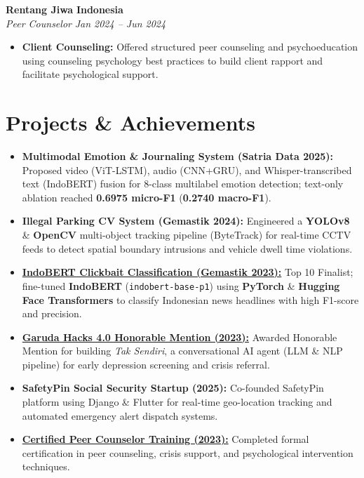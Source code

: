 \documentclass[letterpaper,10pt]{article}
\begin{document}
\noindent \textbf{\large Rentang Jiwa} \hfill \textbf{Indonesia} \\
\textit{Peer Counselor} \hfill \textit{Jan 2024 -- Jun 2024}
\begin{itemize}
    \item \textbf{Client Counseling:} Offered structured peer counseling and psychoeducation using counseling psychology best practices to build client rapport and facilitate psychological support.
\end{itemize}
\vspace{3pt}

\section{Projects \& Achievements}
\vspace{1pt}

\begin{itemize}[leftmargin=0.15in, itemsep=1.2pt]
    \item \textbf{Multimodal Emotion \& Journaling System (Satria Data 2025):} Proposed video (ViT-LSTM), audio (CNN+GRU), and Whisper-transcribed text (IndoBERT) fusion for 8-class multilabel emotion detection; text-only ablation reached \textbf{0.6975 micro-F1} (\textbf{0.2740 macro-F1}).
    \item \textbf{Illegal Parking CV System (Gemastik 2024):} Engineered a \textbf{YOLOv8} \& \textbf{OpenCV} multi-object tracking pipeline (ByteTrack) for real-time CCTV feeds to detect spatial boundary intrusions and vehicle dwell time violations.
    \item \textbf{\href{https://github.com/KronosDP/Clickbait-Classifier-for-Gemastik-2023}{IndoBERT Clickbait Classification (Gemastik 2023):}} Top 10 Finalist; fine-tuned \textbf{IndoBERT} (\texttt{indobert-base-p1}) using \textbf{PyTorch} \& \textbf{Hugging Face Transformers} to classify Indonesian news headlines with high F1-score and precision.
    \item \textbf{\href{https://kronosdp.github.io/cv/sertifikat/Honorable\%20Mention\%20Future\%20of\%20AI-Darrel.png}{Garuda Hacks 4.0 Honorable Mention (2023):}} Awarded Honorable Mention for building \textit{Tak Sendiri}, a conversational AI agent (LLM \& NLP pipeline) for early depression screening and crisis referral.
    \item \textbf{SafetyPin Social Security Startup (2025):} Co-founded SafetyPin platform using Django \& Flutter for real-time geo-location tracking and automated emergency alert dispatch systems.
    \item \textbf{\href{https://kronosdp.github.io/cv/sertifikat/Darrel\%20Danadyaksa\%20Poli_klinik_makara_pc.pdf}{Certified Peer Counselor Training (2023):}} Completed formal certification in peer counseling, crisis support, and psychological intervention techniques.
\end{itemize}
\vspace{3pt}
\end{document}
